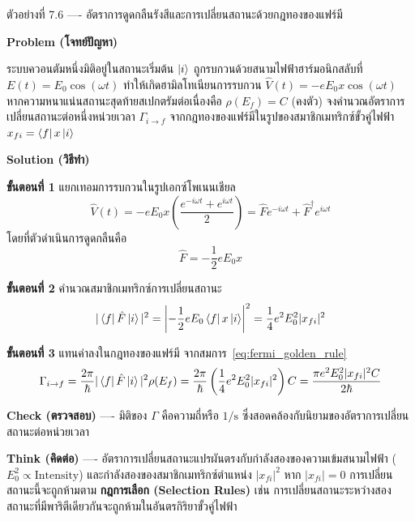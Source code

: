 \begin{psctbox}{ตัวอย่างที่ 7.6 ---- อัตราการดูดกลืนรังสีและการเปลี่ยนสถานะด้วยกฎทองของแฟร์มี}

\textbf{Problem (โจทย์ปัญหา)}

ระบบควอนตัมหนึ่งมิติอยู่ในสถานะเริ่มต้น $\ket{i}$ ถูกรบกวนด้วยสนามไฟฟ้าฮาร์มอนิกสลับที่ $E(t) = E_0 \cos(\omega t)$ ทำให้เกิดฮามิลโทเนียนการรบกวน $\hat{V}(t) = -e E_0 x \cos(\omega t)$ หากความหนาแน่นสถานะสุดท้ายสเปกตรัมต่อเนื่องคือ $\rho(E_f) = C$ (คงตัว) จงคำนวณอัตราการเปลี่ยนสถานะต่อหนึ่งหน่วยเวลา $\Gamma_{i \to f}$ จากกฎทองของแฟร์มีในรูปของสมาชิกเมทริกซ์ขั้วคู่ไฟฟ้า $x_{fi} = \bra{f} x \ket{i}$

\textbf{Solution (วิธีทำ)}

\textbf{ขั้นตอนที่ 1} แยกเทอมการรบกวนในรูปเอกซ์โพเนนเชียล
\begin{equation*}
\hat{V}(t) = -e E_0 x \left( \frac{e^{-i\omega t} + e^{i\omega t}}{2} \right) = \hat{F} e^{-i\omega t} + \hat{F}^\dagger e^{i\omega t}
\end{equation*}
โดยที่ตัวดำเนินการดูดกลืนคือ
\begin{equation*}
\hat{F} = -\frac{1}{2} e E_0 x
\end{equation*}

\textbf{ขั้นตอนที่ 2} คำนวณสมาชิกเมทริกซ์การเปลี่ยนสถานะ
\begin{equation*}
|\bra{f} \hat{F} \ket{i}|^2 = \left| -\frac{1}{2} e E_0 \bra{f} x \ket{i} \right|^2 = \frac{1}{4} e^2 E_0^2 |x_{fi}|^2
\end{equation*}

\textbf{ขั้นตอนที่ 3} แทนค่าลงในกฎทองของแฟร์มี
จากสมการ~\eqref{eq:fermi_golden_rule}
\begin{equation*}
\Gamma_{i \to f} = \frac{2\pi}{\hbar} |\bra{f} \hat{F} \ket{i}|^2 \rho(E_f) = \frac{2\pi}{\hbar} \left( \frac{1}{4} e^2 E_0^2 |x_{fi}|^2 \right) C = \frac{\pi e^2 E_0^2 |x_{fi}|^2 C}{2\hbar}
\end{equation*}

\textbf{Check (ตรวจสอบ)} ---- มิติของ $\Gamma$ คือความถี่หรือ $1/\text{s}$ ซึ่งสอดคล้องกับนิยามของอัตราการเปลี่ยนสถานะต่อหน่วยเวลา

\textbf{Think (คิดต่อ)} ---- อัตราการเปลี่ยนสถานะแปรผันตรงกับกำลังสองของความเข้มสนามไฟฟ้า ($E_0^2 \propto \text{Intensity}$) และกำลังสองของสมาชิกเมทริกซ์ตำแหน่ง $|x_{fi}|^2$ หาก $|x_{fi}| = 0$ การเปลี่ยนสถานะนี้จะถูกห้ามตาม \textbf{กฎการเลือก (Selection Rules)} เช่น การเปลี่ยนสถานะระหว่างสองสถานะที่มีพาริตีเดียวกันจะถูกห้ามในอันตรกิริยาขั้วคู่ไฟฟ้า
\end{psctbox}

